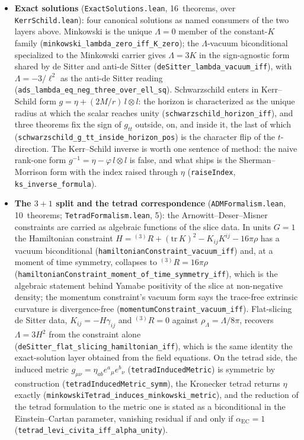 \documentclass[11pt]{article}
\providecommand{\exactSolutionsThms}{16}
\providecommand{\admFormalismThms}{10}
\providecommand{\tetradFormalismThms}{5}
\begin{document}
\begin{itemize}
\item \textbf{Exact solutions} (\texttt{ExactSolutions.lean},
\exactSolutionsThms{}~theorems, over \texttt{KerrSchild.lean}): four
canonical solutions as named consumers of the two layers above.
Minkowski is the unique $\Lambda = 0$ member of the constant-$K$
family (\texttt{minkowski\_lambda\_zero\_iff\_K\_zero}); the
$\Lambda$-vacuum biconditional specialized to the Minkowski carrier
gives $\Lambda = 3K$ in the sign-agnostic form shared by de Sitter
and anti-de Sitter (\texttt{deSitter\_lambda\_vacuum\_iff}), with
$\Lambda = -3/\ell^2$ as the anti-de Sitter reading
(\texttt{ads\_lambda\_eq\_neg\_three\_over\_ell\_sq}). Schwarzschild
enters in Kerr--Schild form $g = \eta + (2M/r)\,l \otimes l$: the
horizon is characterized as the unique radius at which the scalar
reaches unity (\texttt{schwarzschild\_horizon\_iff}), and three
theorems fix the sign of $g_{tt}$ outside, on, and inside it, the
last of which
(\texttt{schwarzschild\_g\_tt\_inside\_horizon\_pos}) is the
character flip of the $t$-direction. The Kerr--Schild inverse is
worth one sentence of method: the naive rank-one form
$g^{-1} = \eta - \varphi\, l \otimes l$ is false, and what ships is
the Sherman--Morrison form with the index raised through $\eta$
(\texttt{raiseIndex}, \texttt{ks\_inverse\_formula}).

\item \textbf{The $3+1$ split and the tetrad correspondence}
(\texttt{ADMFormalism.lean}, \admFormalismThms{}~theorems;
\texttt{TetradFormalism.lean}, \tetradFormalismThms{}): the
Arnowitt--Deser--Misner constraints are carried as algebraic
functions of the slice data. In units $G = 1$ the Hamiltonian
constraint $H = {}^{(3)}\!R + (\mathrm{tr}\,K)^2 - K_{ij}K^{ij} -
16\pi\rho$ has a vacuum biconditional
(\texttt{hamiltonianConstraint\_vacuum\_iff}) and, at a moment of
time symmetry, collapses to ${}^{(3)}\!R = 16\pi\rho$
(\texttt{hamiltonianConstraint\_moment\_of\_time\_symmetry\_iff}),
which is the algebraic statement behind Yamabe positivity of the
slice at non-negative density; the momentum constraint's vacuum form
says the trace-free extrinsic curvature is divergence-free
(\texttt{momentumConstraint\_vacuum\_iff}). Flat-slicing de Sitter
data, $K_{ij} = -H\gamma_{ij}$ and ${}^{(3)}\!R = 0$ against
$\rho_\Lambda = \Lambda/8\pi$, recovers $\Lambda = 3H^2$ from the
constraint alone
(\texttt{deSitter\_flat\_slicing\_hamiltonian\_iff}), which is the
same identity the exact-solution layer obtained from the field
equations. On the tetrad side, the induced metric $g_{\mu\nu} =
\eta_{ab}e^a{}_\mu e^b{}_\nu$ (\texttt{tetradInducedMetric}) is
symmetric by construction
(\texttt{tetradInducedMetric\_symm}), the Kronecker tetrad returns
$\eta$ exactly
(\texttt{minkowskiTetrad\_induces\_minkowski\_metric}), and the
reduction of the tetrad formulation to the metric one is stated as
a biconditional in the Einstein--Cartan parameter,
vanishing residual if and only if $\alpha_{\mathrm{EC}} = 1$
(\texttt{tetrad\_levi\_civita\_iff\_alpha\_unity}).
\end{itemize}
\end{document}
